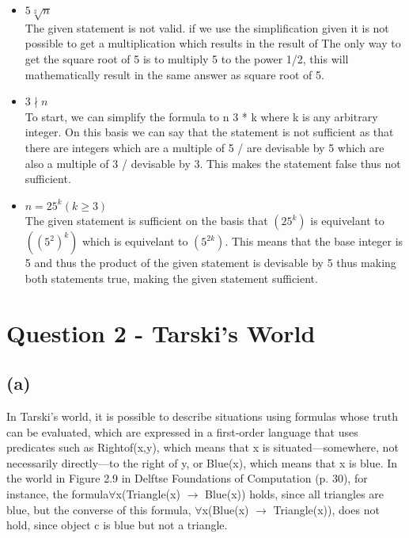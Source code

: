 \documentclass[a4paper]{article}
\begin{document}
\begin{itemize}
    \item $ 5  \sqrt[2]{n} $ \\
    The given statement is not valid. if we use the simplification given it is not possible to get a multiplication which results in the result of 
    The only way to get the square root of 5 is to multiply 5 to the power 1/2, this will mathematically result in the same answer as square root of 5.
    \item $ 3 \nmid n $ \\
    To start, we can simplify the formula to n  3 * k where k is any arbitrary integer.
    On this basis we can say that the statement is not sufficient as that there are integers which are a multiple of 5 / are devisable by 5 which are also a multiple of 3 / devisable by 3.
    This makes the statement false thus not sufficient.
    \item $ n = 25^k (k \ge 3) $ \\ 
    The given statement is sufficient on the basis that $(25^k)$ is equivelant to $ ((5^2)^k) $ which is equivelant to $ (5^{2k}) $.
    This means that the base integer is 5 and thus the product of the given statement is devisable by 5 thus making both statements true, making the given statement sufficient.
    
\end{itemize}

\newpage
\section{Question 2 - Tarski's World}
\subsection{(a)}
In Tarski's world, it is possible to describe situations using formulas whose truth can be evaluated,
which are expressed in a first-order language that uses predicates such as Rightof(x,y),
which means that x is situated—somewhere, not necessarily directly—to the right of y, or Blue(x), which means that x is blue.
In the world in Figure 2.9 in Delftse Foundations of Computation (p. 30), for instance,
the formula$\forall $x(Triangle(x) $\rightarrow $ Blue(x)) holds, since all triangles are blue, but the converse of this
formula, $\forall $x(Blue(x) $\rightarrow $ Triangle(x)), does not hold, since object c is blue but not a triangle.
\end{document}

